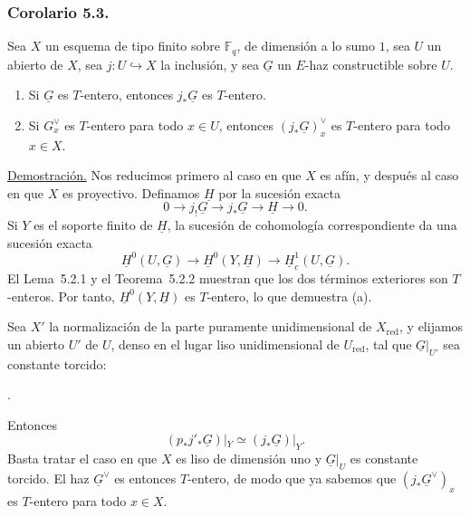 \subsubsection*{Corolario 5.3.}
Sea $X$ un esquema de tipo finito sobre $\mathbb F_q$, de dimensión a lo
sumo $1$, sea $U$ un abierto de $X$, sea $j:U\hookrightarrow X$ la
inclusión, y sea $\underline G$ un $E$-haz constructible sobre $U$.
\begin{enumerate}[label=(\alph*)]
\item Si $\underline G$ es $T$-entero, entonces $j_*\underline G$ es
  $T$-entero.
\item Si $G_x^\vee$ es $T$-entero para todo $x\in U$, entonces
  $(j_*\underline G)_x^\vee$ es $T$-entero para todo $x\in X$.
\end{enumerate}

\pageoriginale

\noindent\underline{Demostración.}
Nos reducimos primero al caso en que $X$ es afín, y después al caso en que
$X$ es proyectivo. Definamos $\underline H$ por la sucesión exacta
\[
0\longrightarrow j_!\underline G\longrightarrow j_*\underline G
\longrightarrow\underline H\longrightarrow0.
\]
Si $Y$ es el soporte finito de $\underline H$, la sucesión de cohomología
correspondiente da una sucesión exacta
\[
\underline H^0(U,\underline G)\longrightarrow
\underline H^0(Y,\underline H)\longrightarrow
\underline H_c^1(U,\underline G).
\]
El Lema~5.2.1 y el Teorema~5.2.2 muestran que los dos términos exteriores
son $T$-enteros. Por tanto, $\underline H^0(Y,\underline H)$ es $T$-entero,
lo que demuestra (a).

Sea $X'$ la normalización de la parte puramente unidimensional de
$X_{\mathrm{red}}$, y elijamos un abierto $U'$ de $U$, denso en el lugar
liso unidimensional de $U_{\mathrm{red}}$, tal que
$\underline G|_{U'}$ sea constante torcido:
\begin{center}
\qquad .
\end{center}
Entonces
\[
(p_*j'_*\underline G)|_Y\simeq(j_*\underline G)|_Y.
\]
Basta tratar el caso en que $X$ es liso de dimensión uno y
$\underline G|_U$ es constante torcido. El haz $\underline G^\vee$ es
entonces $T$-entero, de modo que ya sabemos que
$(j_*\underline G^\vee)_x$ es $T$-entero para todo $x\in X$.


